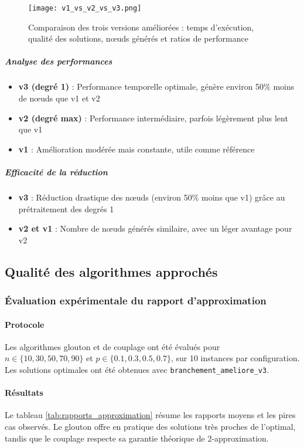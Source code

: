 \documentclass[11pt,a4paper]{article}
\begin{document}
\begin{figure}[H]
  \centering
  \texttt{[image: v1\_vs\_v2\_vs\_v3.png]}
  \caption{Comparaison des trois versions améliorées : temps d'exécution, qualité des solutions, nœuds générés et ratios de performance}
  \label{fig:comparaison_versions}
\end{figure}

\subparagraph{Analyse des performances}
\begin{itemize}
  \item \textbf{v3 (degré 1)} : Performance temporelle optimale, génère environ 50\% moins de nœuds que v1 et v2
  \item \textbf{v2 (degré max)} : Performance intermédiaire, parfois légèrement plus lent que v1
  \item \textbf{v1} : Amélioration modérée mais constante, utile comme référence
\end{itemize}

\subparagraph{Efficacité de la réduction}
\begin{itemize}
  \item \textbf{v3} : Réduction drastique des nœuds (environ 50\% moins que v1) grâce au prétraitement des degrés 1
  \item \textbf{v2 et v1} : Nombre de nœuds générés similaire, avec un léger avantage pour v2
\end{itemize}

\subsection{Qualité des algorithmes approchés}

\subsubsection{Évaluation expérimentale du rapport d'approximation}

\paragraph{Protocole}
Les algorithmes glouton et de couplage ont été évalués pour $n \in \{10,30,50,70,90\}$ et $p \in \{0.1,0.3,0.5,0.7\}$, sur 10 instances par configuration. Les solutions optimales ont été obtenues avec \texttt{branchement\_ameliore\_v3}.

\paragraph{Résultats}
Le tableau \ref{tab:rapports_approximation} résume les rapports moyens et les pires cas observés.  
Le glouton offre en pratique des solutions très proches de l’optimal, tandis que le couplage respecte sa garantie théorique de 2-approximation.
\end{document}
